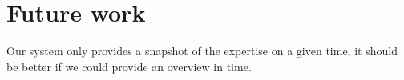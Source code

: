 \chapter{Future work}

Our system only provides a snapshot of the expertise on a given time, it should be better if we could provide an overview in time.